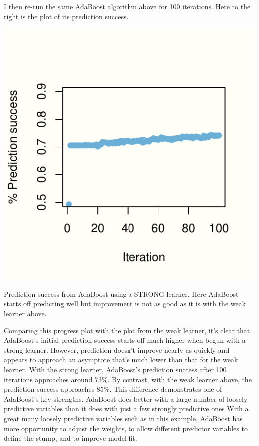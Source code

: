 \documentclass[]{tufte-handout}
\begin{document}
I then re-run the same AdaBoost algorithm above for 100 iterations. Here
to the right is the plot of its prediction success.

\begin{marginfigure}
\includegraphics{2018-02-19-data-science-unplugged-additive-boosting_files/figure-latex/boost.plot.strong-1} \caption[Prediction success from AdaBoost using a STRONG learner]{Prediction success from AdaBoost using a STRONG learner. Here AdaBoost starts off predicting well but improvement is not as good as it is with the weak learner above.}\label{fig:boost.plot.strong}
\end{marginfigure}

Comparing this progress plot with the plot from the weak learner, it's
clear that AdaBoost's initial prediction success starts off much higher
when begun with a strong learner. However, prediction doesn't improve
nearly as quickly and appears to approach an asymptote that's much lower
than that for the weak learner. With the strong learner, AdaBoost's
prediction success after 100 iterations approaches around 73\%. By
contrast, with the weak learner above, the prediction success approaches
85\%. This difference demonstrates one of AdaBoost's key strengths.
AdaBoost does better with a large number of loosely predictive variables
than it does with just a few strongly predictive ones With a great many
loosely predictive variables such as in this example, AdaBoost has more
opportunity to adjust the weights, to allow different predictor
variables to define the stump, and to improve model fit.
\end{document}
